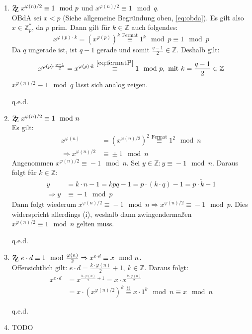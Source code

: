 \documentclass[DIN, pagenumber=false, fontsize=11pt, parskip=half]{scrartcl}
\newcommand{\Z}[0]{\mathbb{Z}}
\newcommand{\ZZ}{\mathrm{Z\kern-.3em\raise-0.5ex\hbox{Z}}}
\newcommand{\congTo}[3][]{\stackrel{#1}{\equiv} #2\mod #3}
\newcommand{\Qed}{\begin{flushright}
    q.e.d.
\end{flushright}}
\begin{document}
    \begin{enumerate}[label=(\roman*)]
        \item $\ZZ \ x^{\varphi(n)/2} \congTo{1}{p}$ und $x^{\varphi(n)/2} \congTo{1}{q}$. \\
              OBdA sei $x < p$ (Siehe allgemeine Begründung oben, \cref{eq:obda}). Es gilt also $x \in \Z_p^*$, da $p$ prim. Dann gilt für $k \in \Z$
              auch folgendes:
              \begin{equation}
                  x^{\varphi(p) \cdot k} = \left(x^{\varphi(p)}\right)^k \congTo[\text{Fermat}]{1^k}{p} \congTo{1}{p}
                  \label{eq:fermatP}
              \end{equation}
              Da $q$ ungerade ist, ist $q - 1$ gerade und somit $\frac{q - 1}{2} \in \Z$. Deshalb gilt:
              \begin{equation}
                  x^{\varphi(p) \cdot \frac{q - 1}{2}} = x^{\varphi(p) \cdot k} \congTo[\ref{eq:fermatP}]{1}{p}, \ \text{mit} \ k = \frac{q - 1}{2} \in \Z
              \end{equation}
              $x^{\varphi(n)/2} \congTo{1}{q}$ lässt sich analog zeigen. \Qed
        \item $\ZZ \ x^{\varphi(n)/2} \congTo{1}{n}$ \\
              Es gilt:
              \begin{align}
                  x^{\varphi(n)} &= \left(x^{\varphi(n)/2}\right)^2 \congTo[\text{Fermat}]{1^2}{n} \\
                  \Rightarrow x^{\varphi(n)/2} &\congTo{\pm 1}{n}
              \end{align}
              Angenommen $x^{\varphi(n)/2} \congTo{-1}{n}$. Sei $y \in \Z : y \congTo{-1}{n}$. Daraus folgt für $k \in \Z$:
              \begin{align}
                  y &= k \cdot n - 1 = k p q - 1 = p \cdot (k \cdot q) - 1 = p \cdot \tilde{k} -1 \\
                  \Rightarrow y &\congTo{-1}{p} \label{eq:mOneInP}
              \end{align}
              Dann folgt wiederum $x^{\varphi(n)/2} \congTo{- 1}{n} \Rightarrow x^{\varphi(n)/2} \congTo{- 1}{p}$. Dies widerspricht allerdings (i), 
              weshalb dann zwingendermaßen $x^{\varphi(n)/2} \congTo{1}{n}$ gelten muss. \Qed
        \item $\ZZ \ e \cdot d \congTo{1}{\frac{\varphi(n)}{2}} \Rightarrow x^{e \cdot d} \congTo{x}{n}$. \\
              Offensichtlich gilt: $e \cdot d = \frac{k \cdot \varphi(n)}{2} + 1, \ k \in \Z$. Daraus folgt:
              \begin{align}
                  x^{e \cdot d} &= x^{\frac{k \cdot \varphi(n)}{2} + 1} = x \cdot x^{\frac{k \cdot \varphi(n)}{2}} \\
                   &= x \cdot \left(x^{\varphi(n)/2}\right)^k \congTo[\text{ii}]{x \cdot 1^k}{n} \congTo{x}{n}
              \end{align}
              \Qed
        \item TODO
    \end{enumerate}
\end{document}
